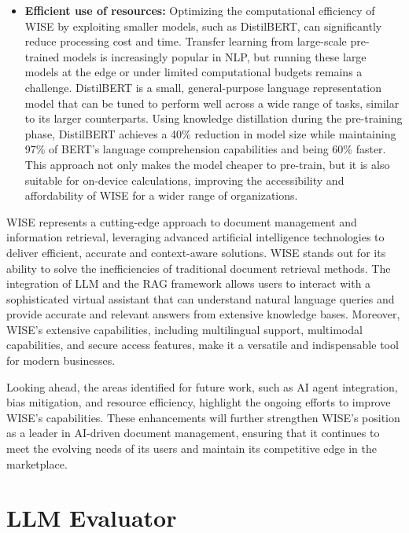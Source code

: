 \begin{itemize}
    \item \textbf{Efficient use of resources:} Optimizing the computational efficiency of WISE by exploiting smaller models, such as DistilBERT, can significantly reduce processing cost and time. Transfer learning from large-scale pre-trained models is increasingly popular in NLP, but running these large models at the edge or under limited computational budgets remains a challenge. DistilBERT is a small, general-purpose language representation model that can be tuned to perform well across a wide range of tasks, similar to its larger counterparts. Using knowledge distillation during the pre-training phase, DistilBERT achieves a 40\% reduction in model size while maintaining 97\% of BERT's language comprehension capabilities and being 60\% faster. This approach not only makes the model cheaper to pre-train, but it is also suitable for on-device calculations, improving the accessibility and affordability of WISE for a wider range of organizations. \cite{sanh2019distilbert}
\end{itemize}

WISE represents a cutting-edge approach to document management and information retrieval, leveraging advanced artificial intelligence technologies to deliver efficient, accurate and context-aware solutions. WISE stands out for its ability to solve the inefficiencies of traditional document retrieval methods. The integration of LLM and the RAG framework allows users to interact with a sophisticated virtual assistant that can understand natural language queries and provide accurate and relevant answers from extensive knowledge bases. Moreover, WISE's extensive capabilities, including multilingual support, multimodal capabilities, and secure access features, make it a versatile and indispensable tool for modern businesses.

Looking ahead, the areas identified for future work, such as AI agent integration, bias mitigation, and resource efficiency, highlight the ongoing efforts to improve WISE's capabilities. These enhancements will further strengthen WISE's position as a leader in AI-driven document management, ensuring that it continues to meet the evolving needs of its users and maintain its competitive edge in the marketplace.

\newpage

\section{LLM Evaluator}

